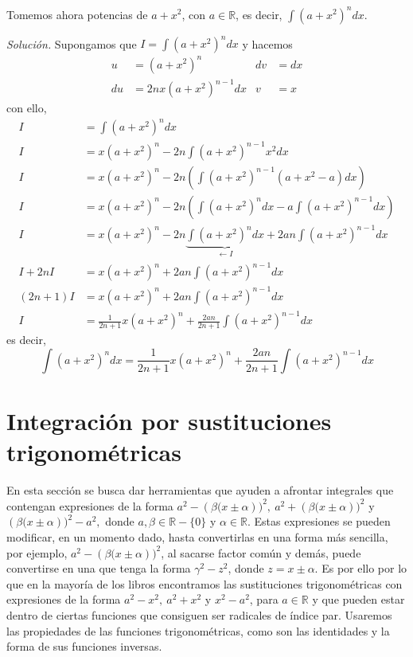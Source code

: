 \begin{ejemplo}
\textnormal{Tomemos ahora potencias de \textit{$a+x^{2}$}, con \textit{$a\in\mathbb{R}$}, es decir,} $\displaystyle{\int \left( a+x^{2}\right)^{n}dx }$.
\end{ejemplo}
\textit{Solución.} Supongamos que $I=\displaystyle{\int \left( a+x^{2}\right)^{n}dx }$ y hacemos
\begin{align*}
u&=\left( a+x^{2}\right)^{n} & dv&=dx \\
du&=2nx\left( a+x^{2}\right) ^{n-1}dx & v&=x
\end{align*}
con ello,
\begin{align*}
 I&= \int \left( a+x^{2}\right) ^{n}dx \\
 I&=x\left( a+x^{2}\right) ^{n}-2n\int \left( a+x^{2}\right) ^{n-1}x^{2}dx\\
 I&=x\left( a+x^{2}\right) ^{n}-2n\left( \int \left( a+x^{2}\right)
^{n-1}\left( a+x^{2}-a\right) dx\right) \\
I&=x\left( a+x^{2}\right) ^{n}-2n\left( \int \left( a+x^{2}\right)
^{n}dx-a\int \left( a+x^{2}\right) ^{n-1}dx\right) \\
I&=x\left( a+x^{2}\right) ^{n}-2n\underbrace{\int \left(
a+x^{2}\right)^{n}dx}_{\leftarrow I}+2an\int \left( a+x^{2}\right) ^{n-1}dx\\
I+2nI&=x\left( a+x^{2}\right) ^{n}+2an\int \left( a+x^{2}\right) ^{n-1}dx\\
\left( 2n+1\right) I&=x\left( a+x^{2}\right) ^{n}+2an\int \left(
a+x^{2}\right) ^{n-1}dx\\
I&=\frac{1}{2n+1}x\left( a+x^{2}\right)
^{n}+\frac{2an}{2n+1}\int \left( a+x^{2}\right) ^{n-1}dx
\end{align*}
es decir,
\[
\int \left( a+x^{2}\right) ^{n}dx=\frac{1}{2n+1}x\left( a+x^{2}\right)
^{n}+\frac{2an}{2n+1}\int \left( a+x^{2}\right) ^{n-1}dx
\]

\section{Integración por sustituciones trigonométricas}
En esta sección se busca dar herramientas que ayuden a afrontar integrales que contengan expresiones de la forma $a^{2}-\left( \beta(x\pm \alpha\right))^{2},\ a^{2}+\left( \beta(x\pm \alpha\right) )^{2}$ y $\left( \beta(x\pm \alpha\right))^{2}-a^{2},$ donde $a, \beta\in\mathbb{R}-\{0\}$ y $\alpha\in \mathbb{R}.$ Estas expresiones se pueden modificar, en un momento dado, hasta convertirlas en una forma más sencilla, por ejemplo, $a^{2}-\left( \beta(x\pm \alpha\right))^{2}$, al sacarse factor común y demás, puede convertirse en una que tenga la forma $\gamma^2-z^2$, donde $z=x\pm \alpha$. Es por ello por lo que en la mayoría de los libros encontramos las sustituciones trigonométricas con expresiones de la forma $a^2-x^2,\ a^2+x^2$ y $x^2-a^2$, para $a\in\mathbb{R}$ y que pueden estar dentro de ciertas funciones que consiguen ser radicales de índice par. Usaremos las propiedades de las funciones trigonométricas, como son las identidades y la forma de sus funciones inversas.


